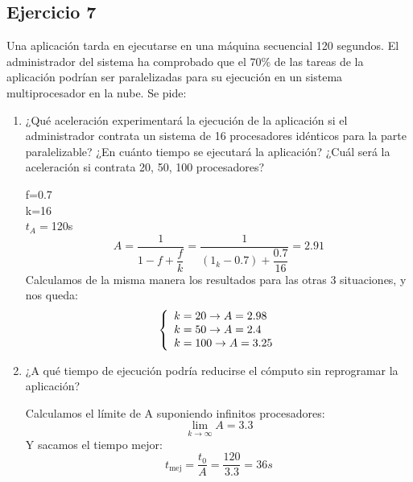 \subsection{Ejercicio 7}
\noindent
Una aplicación tarda en ejecutarse en una máquina secuencial 120 segundos. El administrador del sistema ha comprobado que el 70\% de las tareas de la aplicación podrían ser paralelizadas para su ejecución en un sistema multiprocesador en la nube. Se pide:
\begin{enumerate}
    \item ¿Qué aceleración experimentará la ejecución de la aplicación si el administrador contrata un sistema de 16 procesadores idénticos para la parte paralelizable? ¿En cuánto tiempo se ejecutará la aplicación? ¿Cuál será la aceleración si contrata 20, 50, 100 procesadores?
\begin{tcolorbox}[colback=white,colframe=cyan!50!black,fonttitle=\bfseries]
f=0.7\\
k=16\\
$t_A=$120s
\[
A=\dfrac{1}{1-f+\dfrac{f}{k}}=\dfrac{1}{(1_k-0.7)+\dfrac{0.7}{16}}=2.91
\]
Calculamos de la misma manera los resultados para las otras 3 situaciones, y nos queda:
\[\left\lbrace\begin{array}{lll}
k=20\rightarrow A=2.98\\
k=50\rightarrow A=2.4\\
k=100\rightarrow A=3.25
\end{array}\right.
\]
\end{tcolorbox}    
    \item ¿A qué tiempo de ejecución podría reducirse el cómputo sin reprogramar la aplicación?
\begin{tcolorbox}[colback=white,colframe=cyan!50!black,fonttitle=\bfseries]
Calculamos el límite de A suponiendo infinitos procesadores:
\[
\lim_{k\to\infty}A = 3.3
\]
Y sacamos el tiempo mejor:
\[ %
t_{\text{mej}}=\dfrac{t_0}{A}=\dfrac{120}{3.3}=36s
\]
\end{tcolorbox}    
\end{enumerate}
